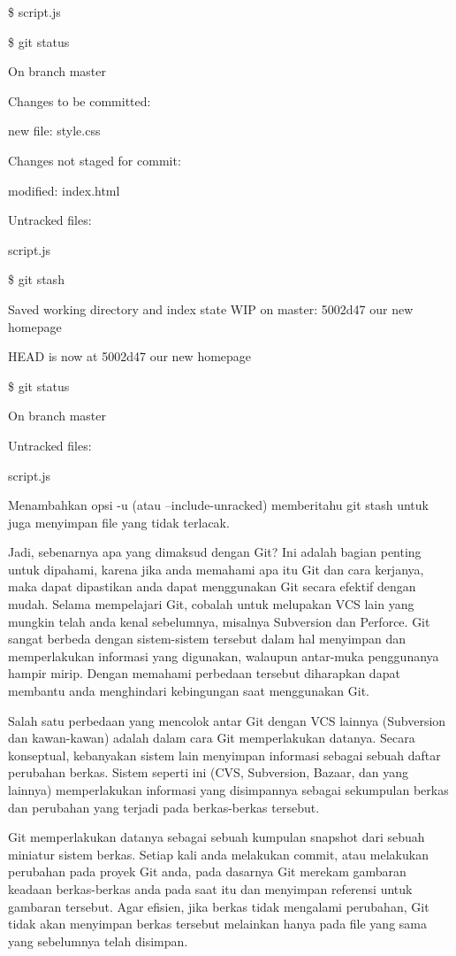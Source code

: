 \$ script.js

\$ git status

On branch master

Changes to be committed:

new file: style.css

Changes not staged for commit:

modified: index.html

Untracked files:

script.js

\$ git stash

Saved working directory and index state WIP on master: 5002d47 our new 
homepage

HEAD is now at 5002d47 our new homepage

\$ git status

On branch master

Untracked files:

script.js

Menambahkan opsi -u (atau --include-unracked) memberitahu git stash 
untuk juga menyimpan file yang tidak terlacak.\vspace{12pt}



Jadi, sebenarnya apa yang dimaksud dengan Git? Ini adalah bagian penting 
untuk dipahami, karena jika anda memahami apa itu Git dan cara kerjanya, 
maka dapat dipastikan anda dapat menggunakan Git secara efektif dengan 
mudah. Selama mempelajari Git, cobalah untuk melupakan VCS lain yang 
mungkin telah anda kenal sebelumnya, misalnya Subversion dan Perforce. 
Git sangat berbeda dengan sistem-sistem tersebut dalam hal menyimpan dan 
memperlakukan informasi yang digunakan, walaupun antar-muka penggunanya 
hampir mirip. Dengan memahami perbedaan tersebut diharapkan dapat 
membantu anda menghindari kebingungan saat menggunakan Git.\vspace{12pt}

Salah satu perbedaan yang mencolok antar Git dengan VCS lainnya 
(Subversion dan kawan-kawan) adalah dalam cara Git memperlakukan 
datanya. Secara konseptual, kebanyakan sistem lain menyimpan informasi 
sebagai sebuah daftar perubahan berkas. Sistem seperti ini (CVS, 
Subversion, Bazaar, dan yang lainnya) memperlakukan informasi yang 
disimpannya sebagai sekumpulan berkas dan perubahan yang terjadi pada 
berkas-berkas tersebut.\vspace{12pt}

Git memperlakukan datanya sebagai sebuah kumpulan snapshot dari sebuah 
miniatur sistem berkas. Setiap kali anda melakukan commit, atau 
melakukan perubahan pada proyek Git anda, pada dasarnya Git merekam 
gambaran keadaan berkas-berkas anda pada saat itu dan menyimpan 
referensi untuk gambaran tersebut. Agar efisien, jika berkas tidak 
mengalami perubahan, Git tidak akan menyimpan berkas tersebut melainkan 
hanya pada file yang sama yang sebelumnya telah disimpan.\vspace{12pt}

